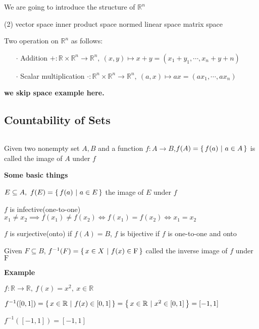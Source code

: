We are going to introduce the structure of $\mathbb R^n$

\begin{tasks}(2)
	\task[$\cdot$] vector space
	\task[$\cdot$] inner product space
	\task[$\cdot$] normed linear space
	\task[$\cdot$] matrix space
\end{tasks}

\begin{defn}
	Two operation on $\mathbb R^n$ as follows:
	
	\begin{enumerate}
		\item[$\cdot$] Addition $+:\mathbb R \times \mathbb R^n \rightarrow \mathbb R^n ,~(x,y) \mapsto x+y = (x_1+y_1,\cdots,x_n+y+n)$
		\item[$\cdot$] Scalar multiplication $\cdot:\mathbb R^n \times \mathbb R^n \rightarrow \mathbb R^n,~(a,x) \mapsto ax=(ax_1,\cdots,ax_n)$ 
	\end{enumerate}
\end{defn}

\textbf{\color{red} we skip space example here.}

\newpage


\subsection{Countability of Sets}$ $

Given two nonempty set $A,B$ and a function $f:A \rightarrow B$,$f(A) = \left\{ \,f(a)~|~a \in A \,\right\}$ is called the image of $A$ under $f$

\textbf{Some basic things}
\begin{tcolorbox}
	$E \subseteq A,~f(E) = \left\{ \,f(a)~|~a \in E \,\right\}$ the image of $E$ under $f$
	
	$f$ is infective(one-to-one) $x_1 \neq x_2 \implies f(x_1) \neq f(x_2) \Leftrightarrow f(x_1) = f(x_2) \Leftrightarrow x_1 = x_2$
	
	$f$ is surjective(onto) if $f(A) = B$, $f$ is bijective if $f$ is one-to-one and onto
\end{tcolorbox}

Given $F \subseteq B$, $f^{-1}(F) = \left\{ \,x \in X~|~f(x) \in \mathrm F \,\right\}$ called the inverse image of $f$ under $\mathrm F$

\textbf{Example}

\begin{tcolorbox}
	$f:\mathbb R \rightarrow \mathbb R,~f(x) = x^2,~x\in \mathbb R$
	
	$f^{-1}([0,1]) = \left\{ \,x\in \mathbb R ~|~ f(x) \in [0,1] \,\right\} = \left\{ \,x \in \mathbb R ~|~ x^2 \in [0,1] \,\right\} = [-1,1]$
	
	$f^{-1}([-1,1]) = [-1,1]$
\end{tcolorbox}


